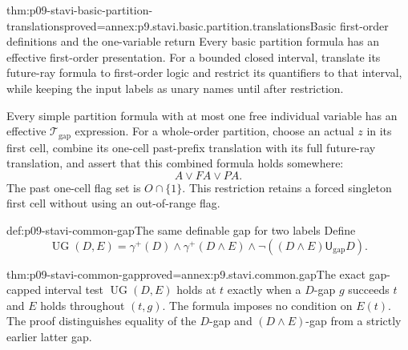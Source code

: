 \begin{hblemma}{thm:p09-stavi-basic-partition-translations}{proved=annex:p9.stavi.basic.partition.translations}{Basic first-order definitions and the one-variable return}
Every basic partition formula has an
effective first-order presentation.
For a bounded closed interval, translate
its future-ray formula to first-order
logic and restrict its quantifiers
to that interval, while keeping the
input labels as unary names until
after restriction.

Every simple partition formula with
at most one free individual variable
has an effective
\(\mathcal T_{\mathrm{gap}}\) expression.
For a whole-order partition, choose
an actual \(z\) in its first cell,
combine its one-cell past-prefix
translation with its full future-ray
translation, and assert that this
combined formula holds somewhere:
\[
                               A\lor FA\lor PA.
\]
The past one-cell flag set is
\(O\cap\{1\}\). This restriction
retains a forced singleton first
cell without using an out-of-range
flag.
\end{hblemma}

\begin{hbdefinition}{def:p09-stavi-common-gap}{The same definable gap for two labels}
Define
\[
 \operatorname{UG}(D,E)=
     \gamma^+(D)\land\gamma^+(D\land E)
              \land\neg((D\land E)\mathbin{\mathsf U_{\mathrm{gap}}}D).
\]
\end{hbdefinition}

\begin{hblemma}{thm:p09-stavi-common-gap}{proved=annex:p9.stavi.common.gap}{The exact gap-capped interval test}
\(\operatorname{UG}(D,E)\) holds at \(t\)
exactly when a \(D\)-gap \(g\) succeeds
\(t\) and \(E\) holds throughout
\((t,g)\). The formula imposes no
condition on \(E(t)\).
The proof distinguishes equality of
the \(D\)-gap and \((D\land E)\)-gap
from a strictly earlier latter gap.
\end{hblemma}


